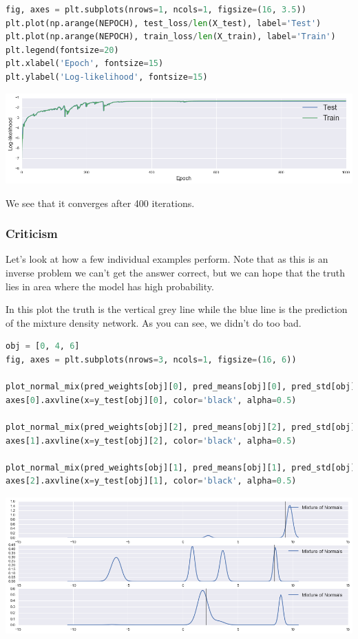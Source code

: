 \begin{lstlisting}[language=Python]
fig, axes = plt.subplots(nrows=1, ncols=1, figsize=(16, 3.5))
plt.plot(np.arange(NEPOCH), test_loss/len(X_test), label='Test')
plt.plot(np.arange(NEPOCH), train_loss/len(X_train), label='Train')
plt.legend(fontsize=20)
plt.xlabel('Epoch', fontsize=15)
plt.ylabel('Log-likelihood', fontsize=15)
\end{lstlisting}

\includegraphics[width=700px]{images/mdn-fig1.png}

We see that it converges after 400 iterations.

\subsubsection{Criticism}

Let's look at how a few individual examples perform. Note that as this
is an inverse problem we can't get the answer correct, but we can hope
that the truth lies in area where the model has high probability.

In this plot the truth is the vertical grey line while the blue line is the prediction of the mixture density network. As you can see, we didn't do too bad.

\begin{lstlisting}[language=Python]
obj = [0, 4, 6]
fig, axes = plt.subplots(nrows=3, ncols=1, figsize=(16, 6))

plot_normal_mix(pred_weights[obj][0], pred_means[obj][0], pred_std[obj][0], axes[0], comp=False)
axes[0].axvline(x=y_test[obj][0], color='black', alpha=0.5)

plot_normal_mix(pred_weights[obj][2], pred_means[obj][2], pred_std[obj][2], axes[1], comp=False)
axes[1].axvline(x=y_test[obj][2], color='black', alpha=0.5)

plot_normal_mix(pred_weights[obj][1], pred_means[obj][1], pred_std[obj][1], axes[2], comp=False)
axes[2].axvline(x=y_test[obj][1], color='black', alpha=0.5)
\end{lstlisting}

\includegraphics[width=700px]{images/mdn-fig2.png}

